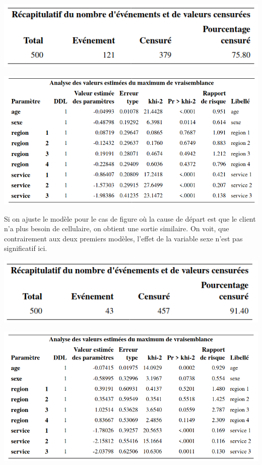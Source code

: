 \documentclass[
  11pt,
  letterpaper,
]{book}
\theoremstyle{definition}
\theoremstyle{definition}
\theoremstyle{definition}
\theoremstyle{definition}
\theoremstyle{remark}
\begin{document}
\begin{center}\includegraphics[width=0.65\linewidth]{figures/05-survie-e26} \end{center}

\begin{center}\includegraphics[width=0.85\linewidth]{figures/05-survie-e27} \end{center}

Si on ajuste le modèle pour le cas de figure où la cause de départ est que le client n'a plus besoin de cellulaire, on obtient une sortie similaire. On voit, que contrairement aux deux premiers modèles, l'effet de la variable sexe n'est pas significatif ici.

\begin{center}\includegraphics[width=0.65\linewidth]{figures/05-survie-e28} \end{center}

\begin{center}\includegraphics[width=0.85\linewidth]{figures/05-survie-e29} \end{center}
\end{document}
